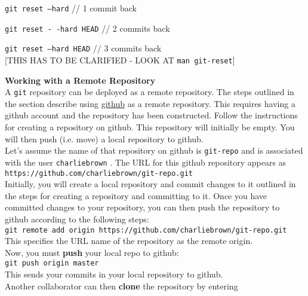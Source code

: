 \documentclass[12pt]{article}
\begin{document}
{\tt git reset --hard} // 1 commit back
 
{\tt git reset - -hard HEAD} // 2 commits back 

{\tt git reset  --hard HEAD} // 3 commits back \\
 
 [THIS HAS TO BE CLARIFIED - LOOK AT {\tt man git-reset}]

\noindent
{\bf Working with a Remote Repository} \\

\noindent
A {\tt git} repository can be deployed as a remote repository. The steps outlined in the section describe using \href{http://github.com}{github} as a remote repository. This requires  having a github account and the repository has been constructed. Follow the instructions for creating a repository on github. This repository will initially be empty. You will then push (i.e. move) a local repository to github.\\

\noindent
Let's assume the name of that repository on github is {\tt git-repo} and is associated with the user {\tt charliebrown} . The {\small URL} for this github repository appears as \\

{\tt https://github.com/charliebrown/git-repo.git} \\

\noindent
Initially, you will create a local repository and commit changes to it outlined in the steps for creating a repository and committing to it. Once you have committed changes to your repository, you can then push the repository to github according to the following steps: \\

{\tt git remote add origin https://github.com/charliebrown/git-repo.git} \\

\noindent
This specifies the {\small URL} name of the repository as the remote origin. \\

\noindent
Now, you must {\bf push} your local repo to github: \\

{\tt git push origin master} \\

\noindent
This sends your commits in your local repository to github. \\

\noindent
Another collaborator can then {\bf clone} the repository by entering \\
\end{document}
